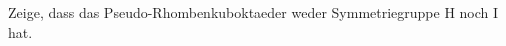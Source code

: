 



\begin{exercise} \label{ex:PseudoRhombenkuboktaeder_Symmetriegruppe}
    Zeige, dass das Pseudo-Rhombenkuboktaeder weder Symmetriegruppe H noch I hat.
\end{exercise}

